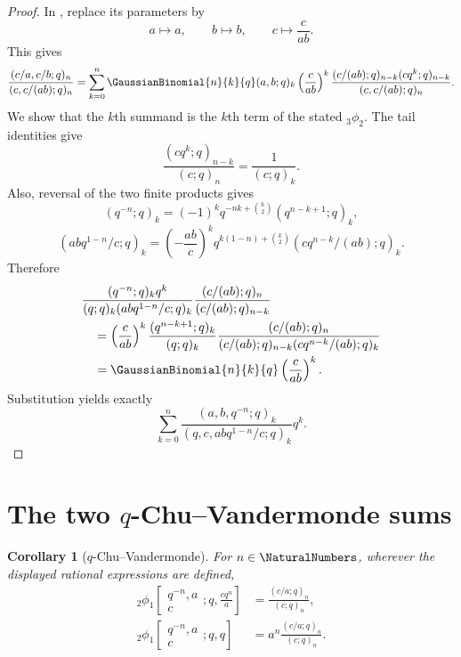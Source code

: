 \documentclass[11pt,a4paper,oneside,openany]{book}
\newtheorem{corollary}[corollary]{Corollary}
\theoremstyle{definition}
\theoremstyle{remark}
\begin{document}
\begin{proof}
In , replace its parameters by
\[
 a\mapsto a,\qquad b\mapsto b,\qquad c\mapsto \frac{c}{ab}.
\]
This gives
\[
 \frac{(c/a,c/b;q)_n}{(c,c/(ab);q)_n}
 =\sum_{k=0}^{n}\GaussianBinomial{n}{k}{q}(a,b;q)_k
 \left(\frac{c}{ab}\right)^k
 \frac{(c/(ab);q)_{n-k}(cq^k;q)_{n-k}}
 {(c,c/(ab);q)_n}.
\]
We show that the $k$th summand is the $k$th term of the stated ${}_3\phi_2$.  The tail identities give
\[
 \frac{(cq^k;q)_{n-k}}{(c;q)_n}=\frac1{(c;q)_k}.
\]
Also, reversal of the two finite products gives
\[
 (q^{-n};q)_k
 =(-1)^kq^{-nk+\binom k2}(q^{n-k+1};q)_k,
\]
\[
 (abq^{1-n}/c;q)_k
 =\left(-\frac{ab}{c}\right)^k
 q^{k(1-n)+\binom k2}
 (cq^{n-k}/(ab);q)_k.
\]
Therefore
\begin{align*}
 &\frac{(q^{-n};q)_k q^k}{(q;q)_k(abq^{1-n}/c;q)_k}
 \frac{(c/(ab);q)_n}{(c/(ab);q)_{n-k}}\\
 &\quad=\left(\frac{c}{ab}\right)^k
 \frac{(q^{n-k+1};q)_k}{(q;q)_k}
 \frac{(c/(ab);q)_n}
 {(c/(ab);q)_{n-k}(cq^{n-k}/(ab);q)_k}\\
 &\quad=\GaussianBinomial{n}{k}{q}\left(\frac{c}{ab}\right)^k.
\end{align*}
Substitution yields exactly
\[
 \sum_{k=0}^{n}
 \frac{(a,b,q^{-n};q)_k}{(q,c,abq^{1-n}/c;q)_k}q^k.
\]
\end{proof}

\section{The two \texorpdfstring{$q$}{q}-Chu--Vandermonde sums}

\begin{corollary}[$q$-Chu--Vandermonde]\label{cor:q-chu}
For $n\in\NaturalNumbers$, wherever the displayed rational expressions are
defined,
\begin{align}
 {}_2\phi_1\!\left[
 \begin{matrix}q^{-n},a\\c\end{matrix};q,\frac{cq^n}{a}\right]
 &=\frac{(c/a;q)_n}{(c;q)_n},\label{eq:qchu1}\\
 {}_2\phi_1\!\left[
 \begin{matrix}q^{-n},a\\c\end{matrix};q,q\right]
 &=a^n\frac{(c/a;q)_n}{(c;q)_n}.
 \label{eq:qchu2}
\end{align}
\end{corollary}
\end{document}

